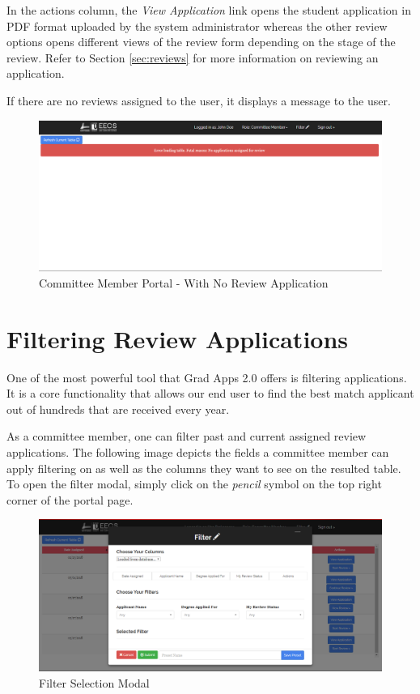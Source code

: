 \documentclass[fontsize=12pt,paper=letter,twoside]{scrartcl}
\begin{document}
\bigskip
\noindent In the actions column, the \emph{View Application} link opens the student application in PDF format uploaded by the system administrator whereas the other review options opens different views of the review form depending on the stage of the review. Refer to Section \ref{sec:reviews} for more information on reviewing an application.

\newpage
\noindent If there are no reviews assigned to the user, it displays a message to the user.

\begin{figure}[!htb]
\begin{center}
\includegraphics[width=.9\textwidth]{images/err_default.png}
\end{center}
\caption{Committee Member Portal - With No Review Application}
\label{fig:cm_portal_err}
\end{figure}
 
\newpage
\section{Filtering Review Applications}

One of the most powerful tool that Grad Apps 2.0 offers is filtering applications. It is a core functionality that allows our end user to find the best match applicant out of hundreds that are received every year.

\bigskip

\noindent As a committee member, one can filter past and current assigned review applications. The following image depicts the fields a committee member can apply filtering on as well as the columns they want to see on the resulted table. To open the filter modal, simply click on the \emph{pencil} symbol on the top right corner of the portal page.

\begin{figure}[!htb]
\begin{center}
\includegraphics[width=.9\textwidth]{images/default_filter_view.png}
\end{center}
\caption{Filter Selection Modal}
\label{fig:def_filter_modal}
\end{figure}
\end{document}
